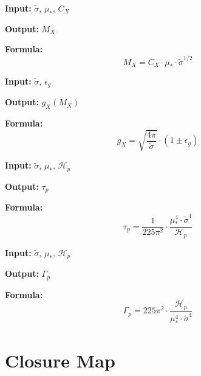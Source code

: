 \documentclass[11pt,a4paper]{article}
\theoremstyle{definition}
\begin{document}
\begin{apibox}
\textbf{Input:} $\tilde{\sigma}$, $\mu_*$, $C_X$

\textbf{Output:} $M_X$

\textbf{Formula:}
\begin{equation}
\label{eq:api-mx1}
M_X = C_X \cdot \mu_* \cdot \tilde{\sigma}^{1/2}
\end{equation}
\end{apibox}

\begin{apibox}
\textbf{Input:} $\tilde{\sigma}$, $\epsilon_g$

\textbf{Output:} $g_X(M_X)$

\textbf{Formula:}
\begin{equation}
\label{eq:api-gx1}
g_X = \sqrt{\frac{4\pi}{\tilde{\sigma}}} \cdot (1 \pm \epsilon_g)
\end{equation}
\end{apibox}

\begin{apibox}
\textbf{Input:} $\tilde{\sigma}$, $\mu_*$, $\mathcal{H}_p$

\textbf{Output:} $\tau_p$

\textbf{Formula:}
\begin{equation}
\label{eq:api-tau1}
\tau_p = \frac{1}{225\pi^2} \cdot \frac{\mu_*^4 \cdot \tilde{\sigma}^4}{\mathcal{H}_p}
\end{equation}
\end{apibox}

\begin{apibox}
\textbf{Input:} $\tilde{\sigma}$, $\mu_*$, $\mathcal{H}_p$

\textbf{Output:} $\Gamma_p$

\textbf{Formula:}
\begin{equation}
\label{eq:api-gamma1}
\Gamma_p = 225\pi^2 \cdot \frac{\mathcal{H}_p}{\mu_*^4 \cdot \tilde{\sigma}^4}
\end{equation}
\end{apibox}

\section{Closure Map}
\label{sec:closure-map}
\end{document}
